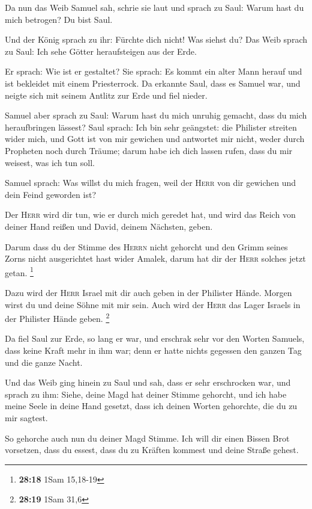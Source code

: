 Da nun das Weib Samuel sah, schrie sie laut und sprach
zu Saul: Warum hast du mich betrogen? Du bist Saul.

 Und der König sprach zu ihr: Fürchte dich nicht! Was
siehst du? Das Weib sprach zu Saul: Ich sehe Götter heraufsteigen aus
der Erde.

 Er sprach: Wie ist er gestaltet? Sie sprach: Es kommt
ein alter Mann herauf und ist bekleidet mit einem Priesterrock. Da
erkannte Saul, dass es Samuel war, und neigte sich mit seinem Antlitz
zur Erde und fiel nieder.

 Samuel aber sprach zu Saul: Warum hast du mich unruhig
gemacht, dass du mich heraufbringen lässest? Saul sprach: Ich bin sehr
geängstet: die Philister streiten wider mich, und Gott ist von mir
gewichen und antwortet mir nicht, weder durch Propheten noch durch
Träume; darum habe ich dich lassen rufen, dass du mir weisest, was ich
tun soll.

 Samuel sprach: Was willst du mich fragen, weil der
\textsc{Herr} von dir gewichen und dein Feind geworden ist?

 Der \textsc{Herr} wird dir tun, wie er durch mich
geredet hat, und wird das Reich von deiner Hand reißen und David, deinem
Nächsten, geben.

 Darum dass du der Stimme des \textsc{Herrn} nicht
gehorcht und den Grimm seines Zorns nicht ausgerichtet hast wider
Amalek, darum hat dir der \textsc{Herr} solches jetzt getan. \footnote{\textbf{28:18}
  1Sam 15,18-19}

 Dazu wird der \textsc{Herr} Israel mit dir auch geben in
der Philister Hände. Morgen wirst du und deine Söhne mit mir sein. Auch
wird der \textsc{Herr} das Lager Israels in der Philister Hände geben.
\footnote{\textbf{28:19} 1Sam 31,6}

 Da fiel Saul zur Erde, so lang er war, und erschrak sehr
vor den Worten Samuels, dass keine Kraft mehr in ihm war; denn er hatte
nichts gegessen den ganzen Tag und die ganze Nacht.

 Und das Weib ging hinein zu Saul und sah, dass er sehr
erschrocken war, und sprach zu ihm: Siehe, deine Magd hat deiner Stimme
gehorcht, und ich habe meine Seele in deine Hand gesetzt, dass ich
deinen Worten gehorchte, die du zu mir sagtest.

 So gehorche auch nun du deiner Magd Stimme. Ich will dir
einen Bissen Brot vorsetzen, dass du essest, dass du zu Kräften kommest
und deine Straße gehest.

